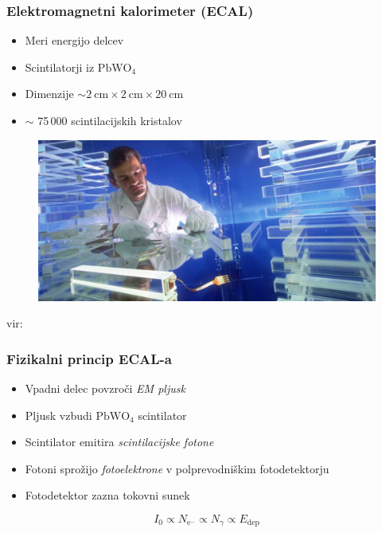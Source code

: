 \documentclass[14pt, t]{beamer}
\newcommand{\chem}[1]{\ensuremath{\mathrm{#1}}}
\begin{document}
\begin{frame}
    \frametitle{Elektromagnetni kalorimeter (ECAL)}
    \begin{itemize}
    
        \item Meri energijo delcev

        \item Scintilatorji iz \chem{PbWO_4} %

        \item Dimenzije $ \sim \SI{2}{\centi \meter} \times \SI{2}{\centi \meter} \times \SI{20}{\centi \meter} $

        \item $ \sim $ 75\,000 scintilacijskih kristalov
    
    \end{itemize}
    \vspace{-5mm}
    \begin{figure}
        \centering
        \includegraphics[width=0.75\linewidth]{raster/png-presentation/ecal-scintillators.jpg}
    \end{figure}
    \vspace{-9mm}
    \hfill
    \tiny{vir: \cite{image-pbwo4}}
    
\end{frame}

\begin{frame}
    \frametitle{Fizikalni princip ECAL-a}
    \begin{itemize}
    
        \item Vpadni delec povzroči \textit{EM pljusk} \pause

        \item Pljusk vzbudi \chem{PbWO_4} scintilator \pause

        \item Scintilator emitira \textit{scintilacijske fotone} \pause

        \item Fotoni sprožijo \textit{fotoelektrone} v polprevodniškim fotodetektorju \pause

        \item Fotodetektor zazna tokovni sunek
    
    \end{itemize}
    \begin{equation*}
        I_{0} \propto N_{\text{e}^{-}}  \propto N_{\gamma} \propto E_{\text{dep}}
    \end{equation*}
    
\end{frame}
\end{document}
